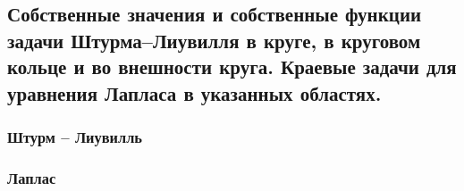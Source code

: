 \subsection{Собственные значения и собственные функции задачи Штурма–Лиувилля в круге, в круговом кольце и во внешности круга. Краевые задачи для уравнения Лапласа в указанных областях.}
\subsubsection{Штурм -- Лиувилль}

\subsubsection{Лаплас}

